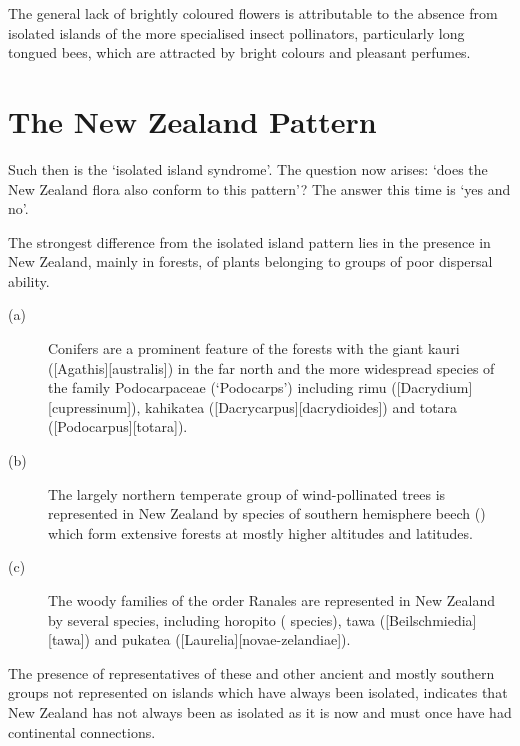 The general lack of brightly coloured flowers is attributable to the absence from isolated islands of the more specialised insect pollinators, particularly long tongued bees, which are attracted by bright colours and pleasant perfumes.

\section{The New Zealand Pattern}

Such then is the `isolated island syndrome'.
The question now arises: `does the New Zealand flora also conform to this pattern'? The answer this time is `yes and no'.

The strongest difference from the isolated island pattern lies in the presence in New Zealand, mainly in forests, of plants belonging to groups of poor dispersal ability.

\begin{description}
\item[{(a)}]Conifers are a prominent feature of the forests with the giant kauri ([Agathis][australis]) in the far north and the more widespread species of the family Podocarpaceae (`Podocarps') including rimu ([Dacrydium][cupressinum]), kahikatea ([Dacrycarpus][dacrydioides]) and totara ([Podocarpus][totara]).
\item[{(b)}]The largely northern temperate group of wind-pollinated trees is represented in New Zealand by species of southern hemisphere beech () which form extensive forests at mostly higher altitudes and latitudes.
\item[{(c)}]The woody families of the order Ranales are represented in New Zealand by several species, including horopito ( species), tawa ([Beilschmiedia][tawa]) and pukatea ([Laurelia][novae-zelandiae]).
\end{description}

The presence of representatives of these and other ancient and mostly southern groups not represented on islands which have always been isolated, indicates that New Zealand has not always been as isolated as it is now and must once have had continental connections.

